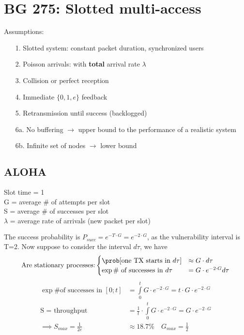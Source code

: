 \section{BG 275: Slotted multi-access}
Assumptions:
\begin{itemize}
  \item[1.] Slotted system: constant packet duration, synchronized users
  \item[2.] Poisson arrivals: with \textbf{total} arrival rate $\lambda$
  \item[3.] Collision or perfect reception
  \item[4.] Immediate $ \{ 0,1, e\}$ feedback
  \item[5.] Retransmission until success (backlogged)
  \item[6a.] No buffering $\rightarrow$ upper bound to the performance of a realistic system
  \item[6b.] Infinite set of nodes $\rightarrow$ lower bound
\end{itemize}
\subsection{ALOHA}
Slot time = 1\\
G = average $\#$ of attempts per slot\\
S = average $\#$ of successes per slot \\
$\lambda$ = average rate of arrivals (new packet per slot)

The success probability is $P_{succ} = e^{-T \cdot G} = e^{-2 \cdot G}$, as the vulnerability interval is T=2.
Now suppose to consider the interval $d\tau$, we have
\begin{equation}\begin{split}
  \text{Are stationary processes:} \begin{cases}
    \prob[\text{one TX starts in $d\tau$}] &\approx G  \cdot d\tau\\
    \exp{\text{\# of successes in $d\tau$}} &= G \cdot e^{-2 \cdot G} d\tau \\
  \end{cases}
  \end{split}
  \end{equation}
  \begin{equation}\begin{split}
  \exp{\text{\# of successes in $[0;t]$}} &= \int\limits_0^t G \cdot e^{-2 \cdot G} = t \cdot G \cdot e^{-2 \cdot G}\\
  \text{S = throughput  }&=\frac{1}{t}\cdot  \int\limits_0^t G \cdot e^{-2 \cdot G} =  G \cdot e^{-2 \cdot G}\\
  \implies S_{max} = \frac{1}{2e}& \approx 18.7\% \quad G_{max} = \frac{1}{2}
\end{split}\end{equation}

